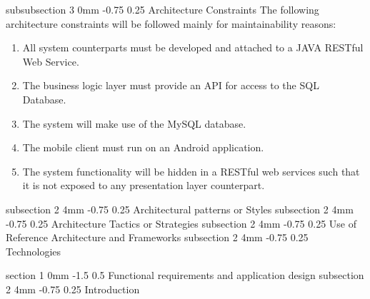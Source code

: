 \documentclass[12pt]{article}
\makeatletter
\renewcommand{\section}{\@startsection
   {section}%
   {1}%
   {0mm}%
   {-1.5\baselineskip}%
   {0.5\baselineskip}%
   {\sffamily\bfseries\upshape\normalsize}}%
\renewcommand{\subsection}{\@startsection
   {subsection}%
   {2}%
   {4mm}%
   {-0.75\baselineskip}%
   {0.25\baselineskip}%
   {\rmfamily\normalfont\scshape\normalsize}}%
\renewcommand{\subsubsection}{\@startsection
   {subsubsection}%
   {3}%
   {0mm}%
   {-0.75\baselineskip}%
   {0.25\baselineskip}%
   {\rmfamily\normalfont\slshape\normalsize}}%
\makeatother
\begin{document}
                			\subsubsection{Architecture Constraints}
                					The following architecture constraints will be followed mainly for maintainability reasons:
                					\begin{enumerate}
                							\item All system counterparts must be developed and attached to a JAVA RESTful Web Service.
                							\item The business logic layer must provide an API for access to the SQL Database.
                							\item The system will make use of the MySQL database.
                							\item The mobile client must run on an Android application.
                							\item The system functionality will be hidden in a RESTful web services such that it is not exposed to any presentation layer counterpart.
                					\end{enumerate}
                				
                			  
                	\subsection{Architectural patterns or Styles}
                    \subsection{Architecture Tactics or Strategies}
                    \subsection{Use of Reference Architecture and Frameworks }
					\subsection{Technologies}
                    
                \section{Functional requirements and application design}
                    \subsection{Introduction}
\end{document}

